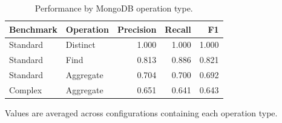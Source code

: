 \begin{table}[htbp]
\centering
\small
\caption{Performance by MongoDB operation type.}
\label{tab:operation-performance}
\begin{tabular}{llrrr}
\toprule
Benchmark & Operation & Precision & Recall & F1 \\
\midrule
Standard & Distinct & 1.000 & 1.000 & 1.000 \\
Standard & Find & 0.813 & 0.886 & 0.821 \\
Standard & Aggregate & 0.704 & 0.700 & 0.692 \\
Complex & Aggregate & 0.651 & 0.641 & 0.643 \\
\bottomrule
\end{tabular}
\par\footnotesize{Values are averaged across configurations containing each operation type.}
\end{table}
